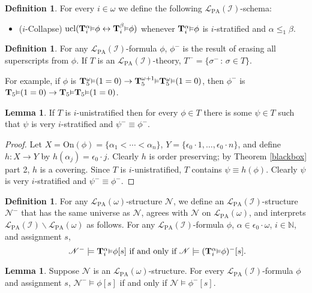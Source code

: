 \documentclass[reqno]{article}
\theoremstyle{definition}
\newtheorem{lemma}[theorem]{Lemma}
\newtheorem{definition}[theorem]{Definition}
\def\N{\mathbb{N}}
\def\L{\mathscr{L}}
\def\T{\mathbf{T}}
\def\LPA{\L_{\mathrm{PA}}}
\def\epom{\epsilon_0\cdot\omega}
\def\indset{\mathcal I}
\def\onset{\mathrm{On}}
\renewcommand{\Pr}[1]{\T_{#1}\mbox{\small${\vDash}$}}
\newcommand{\Prr}[2]{\T^{#1}_{#2}\mbox{\small${\vDash}$}}
\newcommand{\ucl}[1]{\mathrm{ucl}(#1)}
\begin{document}
\begin{definition}
For every $i\in\omega$ we define the following $\LPA(\indset)$-schema:
\begin{itemize}
\item ($i$-Collapse) $\ucl{\Prr\alpha i\phi\leftrightarrow\Prr\beta i\phi}$ whenever
$\Prr\alpha i\phi$ is $i$-stratified and $\alpha\leq_1\beta$.
\end{itemize}
\end{definition}

\begin{definition}
For any $\LPA(\indset)$-formula $\phi$, $\phi^-$ is the result of erasing 
all superscripts from $\phi$.
If $T$ is an $\LPA(\indset)$-theory, $T^-=\{\sigma^-\,:\,\sigma\in 
T\}$.
\end{definition}

For example, if $\phi$ is $\Prr{\omega}{5}(1=0)\rightarrow\Prr{\omega+1}{5}\Prr{\omega}{5}(1=0)$,
then $\phi^-$ is $\Pr{5}(1=0)\rightarrow\Pr{5}\Pr{5}(1=0)$.

\begin{lemma}
\label{verystratifiableaxioms}
If $T$ is $i$-unistratified then for every $\phi\in T$ there is some $\psi\in T$
such that $\psi$ is very $i$-stratified and $\psi^-\equiv\phi^-$.
\end{lemma}

\begin{proof}
Let $X=\onset(\phi)=\{\alpha_1<\cdots<\alpha_n\}$, $Y=\{\epsilon_0\cdot 1,\ldots,\epsilon_0\cdot n\}$,
and define $h:X\to Y$ by $h(\alpha_j)=\epsilon_0\cdot j$.
Clearly $h$ is order preserving; by Theorem \ref{blackbox} part 2, $h$ is a covering.
Since $T$ is $i$-unistratified, $T$ contains $\psi\equiv h(\phi)$.  Clearly $\psi$ is very $i$-stratified and
$\psi^-\equiv\phi^-$.
\end{proof}

\begin{definition}
For any $\LPA(\omega)$-structure $\mathscr N$,
we define an $\LPA(\indset)$-structure $\mathscr N^-$
that has the same universe as $\mathscr N$, agrees with $\mathscr N$
on $\LPA(\omega)$,
and interprets $\LPA(\indset)\backslash\LPA(\omega)$ as follows.
For any $\LPA(\indset)$-formula $\phi$, $\alpha\in\epom$, $i\in\N$, and assignment $s$,
\[
\mbox{
$\mathscr N^- \models \Prr\alpha i\phi[s]$ if and only if $\mathscr N\models (\Prr\alpha i\phi)^-[s]$.}
\]
\end{definition}


\begin{lemma}
\label{structuregrowingmagic}
Suppose $\mathscr N$ is an $\LPA(\omega)$-structure.
For every $\LPA(\indset)$-formula $\phi$ and assignment $s$,
$\mathscr N^-\models\phi[s]$ if and only if $\mathscr N\models\phi^-[s]$.
\end{lemma}
\end{document}
